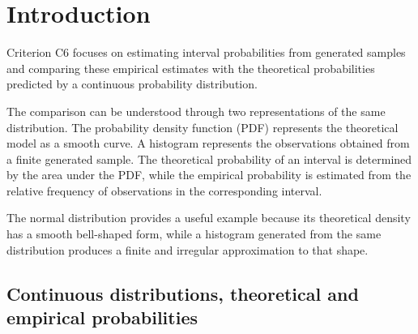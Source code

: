 	\vspace{-4mm}
	

\section{Introduction}\label{sec:c6-introduction}

\vspace{8mm}

Criterion C6 focuses on estimating interval probabilities from generated
samples and comparing these empirical estimates with the theoretical
probabilities predicted by a continuous probability distribution.

The comparison can be understood through two representations of the same
distribution. The probability density function (PDF) represents the
theoretical model as a smooth curve. A histogram represents the observations
obtained from a finite generated sample. The theoretical probability of an
interval is determined by the area under the PDF, while the empirical
probability is estimated from the relative frequency of observations in the
corresponding interval.

The normal distribution provides a useful example because its theoretical
density has a smooth bell-shaped form, while a histogram generated from the
same distribution produces a finite and irregular approximation to that
shape.



\subsection{Continuous distributions, theoretical and empirical probabilities}
\label{sec:c6-intro-distributions}

\setlength{\DistributionGraphWidth}{0.45\textwidth}
\setlength{\DistributionGraphHeight}{4cm}

